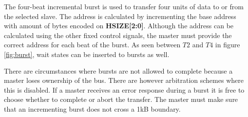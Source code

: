 The four-beat incremental burst is used to transfer four units of data to or from the selected slave. The address is calculated by incrementing the base address
with amount of bytes encoded on \textbf{HSIZE[2:0]}. Although the address can be calculated using the other fixed control signals, the master must provide the correct address for each beat of the burst. As seen between $T2$ and $T4$ in figure \ref{fig:burst}, wait states can be inserted to bursts as well. \par
There are circumstances where bursts are not allowed to complete because a master loses ownership of the bus. There are however arbitration schemes where this is disabled. If a master receives an error response during a burst it is free to choose whether to complete or abort the transfer. The master must make sure
that an incrementing burst does not cross a 1kB boundary.  



